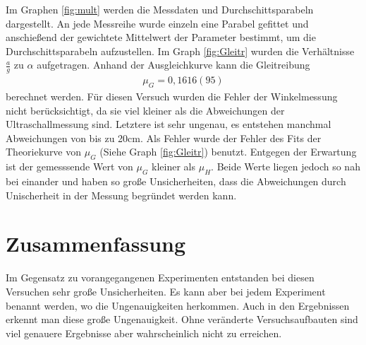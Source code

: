 \documentclass[11pt, a4paper]{article}
\begin{document}
    Im Graphen \ref{fig:mult} werden die Messdaten und Durchschittsparabeln dargestellt. An jede Messreihe wurde 
    einzeln eine Parabel gefittet und anschießend der gewichtete Mittelwert der Parameter bestimmt, um die
    Durchschittsparabeln aufzustellen.
    Im Graph \ref{fig:Gleitr} wurden die Verhältnisse $\frac{a}{g}$ zu $\alpha$ aufgetragen. Anhand der Ausgleichkurve kann die Gleitreibung
    \begin{align}
        \mu_G = 0,1616(95)
    \end{align}
    berechnet werden. Für diesen Versuch wurden die Fehler der Winkelmessung nicht berücksichtigt, da sie viel kleiner als
    die Abweichungen der Ultraschallmessung sind. Letztere ist sehr ungenau, es entstehen manchmal Abweichungen von bis zu 20cm.
    Als Fehler wurde der Fehler des Fits der Theoriekurve von $\mu_G$ (Siehe Graph \ref{fig:Gleitr}) benutzt.
    Entgegen der Erwartung ist der gemesssende Wert von $\mu_G$ kleiner als $\mu_H$. Beide Werte liegen jedoch so nah bei einander
    und haben so große Unsicherheiten, dass die Abweichungen durch Unischerheit in der Messung begründet werden kann.


    \section{Zusammenfassung}

    Im Gegensatz zu vorangegangenen Experimenten entstanden bei diesen Versuchen sehr große Unsicherheiten. Es kann aber 
    bei jedem Experiment benannt werden, wo die Ungenauigkeiten herkommen. Auch in den Ergebnissen erkennt man diese große Ungenauigkeit.
    Ohne veränderte Versuchsaufbauten sind viel genauere Ergebnisse aber wahrscheinlich nicht zu erreichen.

    
    
\end{document}
